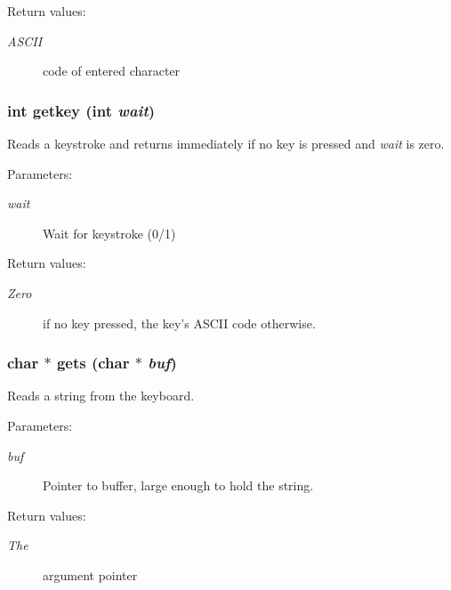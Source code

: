 \begin{Desc}
\item[Return values: ]\par
\begin{description}
\item[{\em 
ASCII}]code of entered character \end{description}
\end{Desc}
\subsubsection{\setlength{\rightskip}{0pt plus 5cm}int getkey (int {\em wait})}\label{hpconio_8h_a21}


Reads a keystroke and returns immediately if no key is pressed and {\em wait} is zero.

\begin{Desc}
\item[Parameters: ]\par
\begin{description}
\item[{\em 
wait}]Wait for keystroke (0/1) \end{description}
\end{Desc}
\begin{Desc}
\item[Return values: ]\par
\begin{description}
\item[{\em 
Zero}]if no key pressed, the key's ASCII code otherwise. \end{description}
\end{Desc}
\subsubsection{\setlength{\rightskip}{0pt plus 5cm}char $\ast$ gets (char $\ast$ {\em buf})}\label{hpconio_8h_a22}


Reads a string from the keyboard.

\begin{Desc}
\item[Parameters: ]\par
\begin{description}
\item[{\em 
buf}]Pointer to buffer, large enough to hold the string. \end{description}
\end{Desc}
\begin{Desc}
\item[Return values: ]\par
\begin{description}
\item[{\em 
The}]argument pointer \end{description}
\end{Desc}
